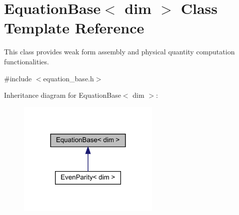 \hypertarget{class_equation_base}{}\section{Equation\+Base$<$ dim $>$ Class Template Reference}
\label{class_equation_base}


This class provides weak form assembly and physical quantity computation functionalities.  




{\ttfamily \#include $<$equation\+\_\+base.\+h$>$}



Inheritance diagram for Equation\+Base$<$ dim $>$\+:\nopagebreak
\begin{figure}[H]
\begin{center}
\leavevmode
\includegraphics[width=192pt]{class_equation_base__inherit__graph}
\end{center}
\end{figure}
